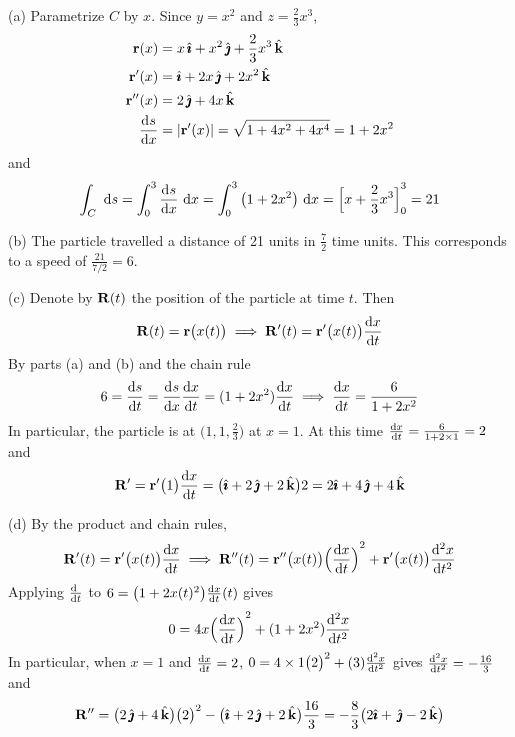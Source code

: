 \begin{solution}
(a) Parametrize $C$ by $x$. Since $y=x^2$ and $z=\frac{2}{3}x^3$,
\begin{align*}
\vr(x)&=x\,\hi+x^2\,\hj+\frac{2}{3}x^3\,\hk\\
\vr'(x)&=\hi+2x\,\hj+2x^2\,\hk\\
\vr''(x)&=2\,\hj+4x\,\hk\\
\diff{s}{x}
&=|\vr'(x)|
=\sqrt{1+4x^2+4x^4}=1+2x^2
\end{align*}
and
$$
\int_C \ \dee{s}
=\int_0^3 \diff{s}{x}\ \dee{x}
=\int_0^3 \big(1+2x^2\big)\ \dee{x}
={\Big[x+\frac{2}{3}x^3\Big]}_0^3
=21
$$

(b) The particle travelled a distance of 21 units in $\frac{7}{2}$
time units. This corresponds to a speed of $\frac{21}{7/2}=6$.

(c) Denote by $\mathbf{R}(t)$ the position of the particle at time $t$.
Then
$$
\vR(t)=\vr\big(x(t)\big)\implies
\vR'(t)=\vr'\big(x(t)\big)\diff{x}{t}
$$
By parts (a) and (b) and the chain rule
$$
6=\diff{s}{t}=\diff{s}{x}\diff{x}{t}=(1+2x^2)\diff{x}{t}
\implies \diff{x}{t}=\frac{6}{1+2x^2}
$$
In particular, the particle is at $\big(1,1,\frac{2}{3}\big)$ at $x=1$.
At this time $\diff{x}{t}=\frac{6}{1+2\times 1}=2$ and
$$
\vR'=\vr'\big(1\big)\diff{x}{t}
=\big(\hi+2\,\hj+2\,\hk\big)2
=2\hi+4\,\hj+4\,\hk
$$

(d) By the product and chain rules,
$$
\vR'(t)=\vr'\big(x(t)\big)\diff{x}{t}\implies
\vR''(t)=\vr''\big(x(t)\big){\Big(\diff{x}{t}\Big)}^2
+\vr'\big(x(t)\big)\difftwo{x}{t}
$$
Applying $\diff{\hfill}{t}$ to $6=\big(1+2x(t)^2\big)\diff{x}{t}(t)$ gives
$$
0=4x{\Big(\diff{x}{t}\Big)}^2+(1+2x^2)\difftwo{x}{t}
$$
In particular, when $x=1$ and $\diff{x}{t}=2$,
 $0=4\times 1\big(2\big)^2+(3)\difftwo{x}{t}$ gives
$\difftwo{x}{t}=-\frac{16}{3}$ and
$$
\mathbf{R}''=\big(2\,\hat{\pmb{\jmath}}+4\,\hat{\mathbf{k}}\big)\big(2\big)^2
-\big(\hat{\pmb{\imath}}+2\,\hat{\pmb{\jmath}}+2\,\hat{\mathbf{k}}\big)\frac{16}{3}
= -\frac{8}{3}\big(2\hat{\pmb{\imath}}+\,\hat{\pmb{\jmath}}-2\,\hat{\mathbf{k}}\big)
$$

\end{solution}







